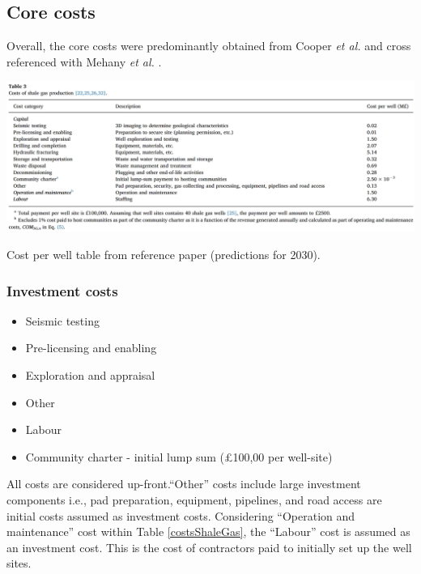 \documentclass[10pt]{article}
\begin{document}
\subsection{Core costs}
Overall, the core costs were predominantly obtained from Cooper \textit{et al.} and cross referenced with Mehany \textit{et al.} \cite{COOPER2018577,MEHANY2019375}.
\begin{table}[H]
    \centering
    \includegraphics[width = \textwidth]{fig1.png}
    \caption{Cost per well table from reference paper \cite{COOPER2018577} (predictions for 2030).}
    \label{costsShaleGas}
\end{table}
\subsubsection{Investment costs}
\begin{itemize}
    \item Seismic testing
    \item Pre-licensing and enabling
    \item Exploration and appraisal
    \item Other
    \item Labour
    \item Community charter - initial lump sum (\pounds 100,00 per well-site)
\end{itemize}
All costs are considered up-front.``Other'' costs include large investment components i.e., pad preparation, equipment, pipelines, and road access are initial costs assumed as investment costs. Considering ``Operation and maintenance'' cost within Table \ref{costsShaleGas}, the ``Labour'' cost is assumed as an investment cost. This is the cost of contractors paid to initially set up the well sites.
\end{document}
